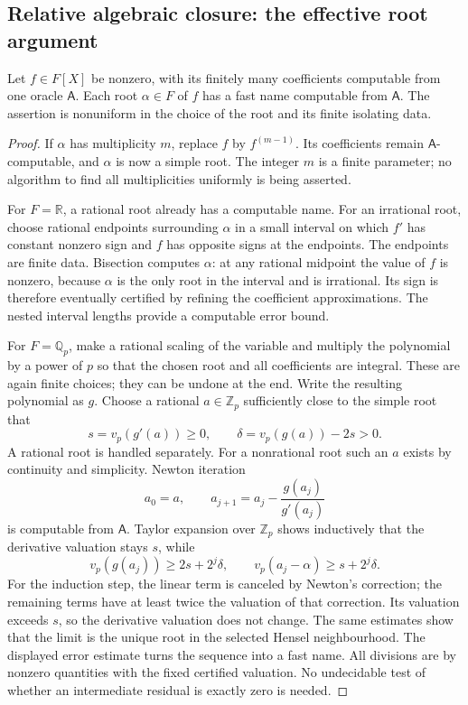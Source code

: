 \documentclass[11pt]{article}
\theoremstyle{definition}
\theoremstyle{remark}
\newcommand{\R}{\mathbb{R}}
\newcommand{\Qp}{\mathbb{Q}_p}
\newcommand{\Zp}{\mathbb{Z}_p}
\begin{document}
\subsection{Relative algebraic closure: the effective root argument}
\begin{lemma}\label{isg:ptg:lem:roots}
Let $f\in F[X]$ be nonzero, with its finitely many coefficients computable
from one oracle $\mathsf A$. Each root $\alpha\in F$ of $f$ has a fast name
computable from $\mathsf A$. The assertion is nonuniform in the choice of
the root and its finite isolating data.
\end{lemma}
\begin{proof}
If $\alpha$ has multiplicity $m$, replace $f$ by $f^{(m-1)}$. Its
coefficients remain $\mathsf A$-computable, and $\alpha$ is now a simple
root. The integer $m$ is a finite parameter; no algorithm to find all
multiplicities uniformly is being asserted.

For $F=\R$, a rational root already has a computable name. For an
irrational root, choose rational endpoints surrounding $\alpha$ in a small
interval on which $f'$ has constant nonzero sign and $f$ has opposite signs
at the endpoints. The endpoints are finite data. Bisection computes
$\alpha$: at any rational midpoint the value of $f$ is nonzero, because
$\alpha$ is the only root in the interval and is irrational. Its sign is
therefore eventually certified by refining the coefficient approximations.
The nested interval lengths provide a computable error bound.

For $F=\Qp$, make a rational scaling of the variable and multiply the
polynomial by a power of $p$ so that the chosen root and all coefficients
are integral. These are again finite choices; they can be undone at the
end. Write the resulting polynomial as $g$. Choose a rational $a\in\Zp$
sufficiently close to the simple root that
\[
 s=v_p(g'(a))\geq0,\qquad
 \delta=v_p(g(a))-2s>0.
\]
A rational root is handled separately. For a nonrational root such an $a$
exists by continuity and simplicity. Newton iteration
\[
 a_0=a,\qquad a_{j+1}=a_j-\frac{g(a_j)}{g'(a_j)}
\]
is computable from $\mathsf A$. Taylor expansion over $\Zp$ shows
inductively that the derivative valuation stays $s$, while
\[
 v_p(g(a_j))\geq 2s+2^j\delta,
 \qquad v_p(a_j-\alpha)\geq s+2^j\delta.
\]
For the induction step, the linear term is canceled by Newton's correction;
the remaining terms have at least twice the valuation of that correction.
Its valuation exceeds $s$, so the derivative valuation does not change. The
same estimates show that the limit is the unique root in the selected
Hensel neighbourhood. The displayed error estimate turns the sequence into
a fast name. All divisions are by nonzero quantities with the fixed
certified valuation. No undecidable test of whether an intermediate
residual is exactly zero is needed.
\end{proof}
\end{document}
